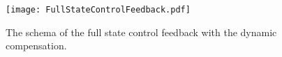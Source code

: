 	\begin{figure}[]
		\centering
		\texttt{[image: FullStateControlFeedback.pdf]}
		\caption{The schema of the full state control feedback with the dynamic compensation.}
		\label{fig:full state}
	\end{figure}
	
